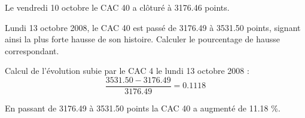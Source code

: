 \begin{questions}
\begin{solution}
			Le vendredi 10 octobre le CAC 40 a clôturé à  \num{3176.46} points.
		\end{solution}
	
	\question[1\half] Lundi 13 octobre 2008, le CAC 40 est passé de \num{3176.49} à \num{3531.50} points, signant ainsi la plus forte hausse de son histoire. 
	Calculer le pourcentage de hausse correspondant.  
		\begin{solution}
			
			Calcul de l'évolution subie par le CAC 4 le lundi 13 octobre 2008 :
			\begin{equation*}
				\frac{\num{3531.50} - \num{3176.49}}{\num{3176.49}} = \num{0.1118}
			\end{equation*}
			
			En passant de \num{3176.49} à \num{3531.50} points la CAC 40 a augmenté de \num{11.18} \%. 
		\end{solution}
\end{questions} 
